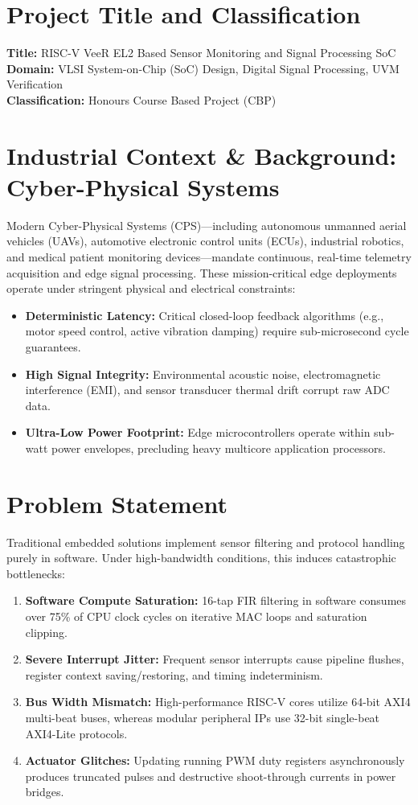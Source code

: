 \documentclass[12pt,a4paper,oneside]{report}
\begin{document}
\section{Project Title and Classification}
\textbf{Title:} RISC-V VeeR EL2 Based Sensor Monitoring and Signal Processing SoC\\
\textbf{Domain:} VLSI System-on-Chip (SoC) Design, Digital Signal Processing, UVM Verification\\
\textbf{Classification:} Honours Course Based Project (CBP)

\section{Industrial Context \& Background: Cyber-Physical Systems}
Modern Cyber-Physical Systems (CPS)—including autonomous unmanned aerial vehicles (UAVs), automotive electronic control units (ECUs), industrial robotics, and medical patient monitoring devices—mandate continuous, real-time telemetry acquisition and edge signal processing. These mission-critical edge deployments operate under stringent physical and electrical constraints:
\begin{itemize}
    \item \textbf{Deterministic Latency:} Critical closed-loop feedback algorithms (e.g., motor speed control, active vibration damping) require sub-microsecond cycle guarantees.
    \item \textbf{High Signal Integrity:} Environmental acoustic noise, electromagnetic interference (EMI), and sensor transducer thermal drift corrupt raw ADC data.
    \item \textbf{Ultra-Low Power Footprint:} Edge microcontrollers operate within sub-watt power envelopes, precluding heavy multicore application processors.
\end{itemize}

\section{Problem Statement}
Traditional embedded solutions implement sensor filtering and protocol handling purely in software. Under high-bandwidth conditions, this induces catastrophic bottlenecks:
\begin{enumerate}
    \item \textbf{Software Compute Saturation:} 16-tap FIR filtering in software consumes over 75\% of CPU clock cycles on iterative MAC loops and saturation clipping.
    \item \textbf{Severe Interrupt Jitter:} Frequent sensor interrupts cause pipeline flushes, register context saving/restoring, and timing indeterminism.
    \item \textbf{Bus Width Mismatch:} High-performance RISC-V cores utilize 64-bit AXI4 multi-beat buses, whereas modular peripheral IPs use 32-bit single-beat AXI4-Lite protocols.
    \item \textbf{Actuator Glitches:} Updating running PWM duty registers asynchronously produces truncated pulses and destructive shoot-through currents in power bridges.
\end{enumerate}
\end{document}
